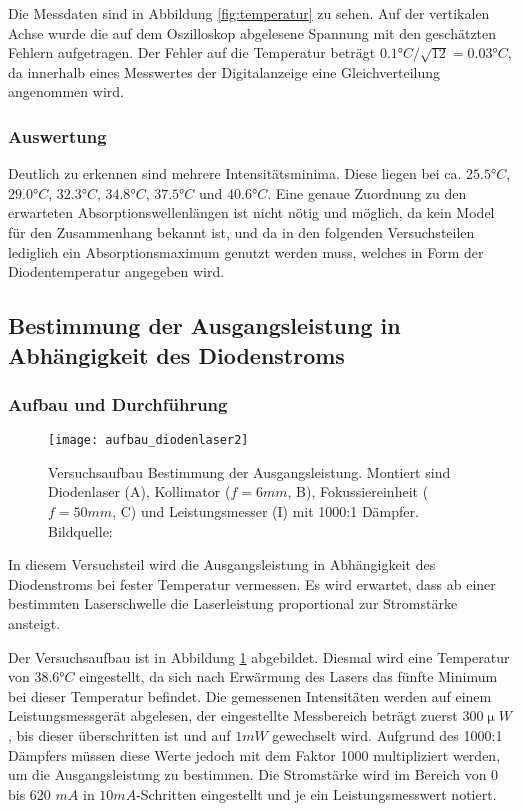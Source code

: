 \documentclass{../Misc/MontavonLaTeX/Montavon}
\newcommand{\fullwidth}{1.0\textwidth}
\begin{document}
Die Messdaten sind in Abbildung \ref{fig:temperatur} zu sehen. Auf der vertikalen Achse wurde die auf dem Oszilloskop abgelesene Spannung mit den geschätzten Fehlern aufgetragen. Der Fehler auf die Temperatur beträgt $0.1 \unit{\degree C} / \sqrt{12} = 0.03 \unit{\degree C}$, da innerhalb eines Messwertes der Digitalanzeige eine Gleichverteilung angenommen wird.

\subsubsection{Auswertung}
Deutlich zu erkennen sind mehrere Intensitätsminima. Diese liegen bei ca. $25.5 \unit{\degree C}$, $29.0 \unit{\degree C}$, $32.3 \unit{\degree C}$, $34.8 \unit{\degree C}$, $37.5 \unit{\degree C}$ und $40.6 \unit{\degree C}$. Eine genaue Zuordnung zu den erwarteten Absorptionswellenlängen ist nicht nötig und möglich, da kein Model für den Zusammenhang bekannt ist, und da in den folgenden Versuchsteilen lediglich ein Absorptionsmaximum genutzt werden muss, welches in Form der Diodentemperatur angegeben wird.

\subsection{Bestimmung der Ausgangsleistung in Abhängigkeit des Diodenstroms}

\subsubsection{Aufbau und Durchführung}
\begin{figure}[htbp]
\centering
\texttt{[image: aufbau\_diodenlaser2]}
\caption{Versuchsaufbau Bestimmung der Ausgangsleistung. Montiert sind Diodenlaser (A), Kollimator ($f = 6 \unit{mm}$, B), Fokussiereinheit ($f = 50 \unit{mm}$, C) und Leistungsmesser (I) mit 1000:1 Dämpfer. Bildquelle: \cite[S. 35]{anleitung1}}
\label{fig:aufbau_diodenlaser2}
\end{figure}

In diesem Versuchsteil wird die Ausgangsleistung in Abhängigkeit des Diodenstroms bei fester Temperatur vermessen. Es wird erwartet, dass ab einer bestimmten Laserschwelle die Laserleistung proportional zur Stromstärke ansteigt.

Der Versuchsaufbau ist in Abbildung \ref{fig:aufbau_diodenlaser2} abgebildet. Diesmal wird eine Temperatur von $38.6 \unit{\degree C}$ eingestellt, da sich nach Erwärmung des Lasers das fünfte Minimum bei dieser Temperatur befindet. Die gemessenen Intensitäten werden auf einem Leistungsmessgerät abgelesen, der eingestellte Messbereich beträgt zuerst $300 \unit{\upmu W}$, bis dieser überschritten ist und auf $1 \unit{mW}$ gewechselt wird. Aufgrund des 1000:1 Dämpfers müssen diese Werte jedoch mit dem Faktor 1000 multipliziert werden, um die Ausgangsleistung zu bestimmen. Die Stromstärke wird im Bereich von 0 bis 620 $\unit{mA}$ in $10 \unit{mA}$-Schritten eingestellt und je ein Leistungsmesswert notiert.
\end{document}
